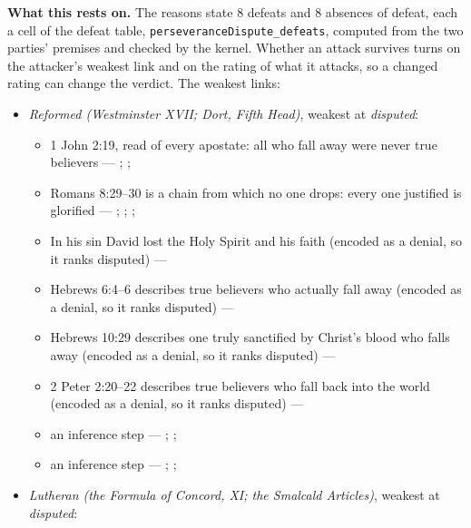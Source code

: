 \documentclass[11pt]{article}
\begin{document}
\par\noindent\textbf{What this rests on.} The reasons state 8 defeats and 8 absences of defeat, each a cell of the defeat table, \texttt{perseverance\allowbreak{}Dispute\_\allowbreak{}defeats}, computed from the two parties' premises and checked by the kernel. Whether an attack survives turns on the attacker's weakest link and on the rating of what it attacks, so a changed rating can change the verdict. The weakest links:
\begin{itemize}
\item \emph{Reformed (Westminster XVII; Dort, Fifth Head)}, weakest at \emph{disputed}:
\begin{itemize}
\item 1 John 2:19, read of every apostate: all who fall away were never true believers --- \cite[594--595]{owen-works-11-perseverance}; \cite[191--192]{calvin-commentaries-catholic-epistles}; \cite[479--480]{npnf1-05-1887}
\item Romans 8:29–30 is a chain from which no one drops: every one justified is glorified --- \cite[582--583]{schaff-creeds-christendom-3-1977}; \cite[557]{schaff-creeds-christendom-3-1977}; \cite[384]{wesley-explanatory-notes-nt}; \cite[413]{wesley-works-9-1827}
\item In his sin David lost the Holy Spirit and his faith (encoded as a denial, so it ranks disputed) --- \cite[299--300]{calvin-psalms-2-1846}
\item Hebrews 6:4–6 describes true believers who actually fall away (encoded as a denial, so it ranks disputed) --- \cite[137--138]{calvin-hebrews-1853}
\item Hebrews 10:29 describes one truly sanctified by Christ’s blood who falls away (encoded as a denial, so it ranks disputed) --- \cite[545--546]{owen-works-23-1855}
\item 2 Peter 2:20–22 describes true believers who fall back into the world (encoded as a denial, so it ranks disputed) --- \cite[410--412]{calvin-commentaries-catholic-epistles}
\item an inference step --- \cite[444--445]{wesley-works-9-1827}; \cite[415--416]{calvin-commentary-john-1847}; \cite[Solid Declaration XI.45]{concordia-triglotta-1921}
\item an inference step --- \cite[Trent, Session VI (1547), ch. 13]{tanner-decrees-1990}; \cite[40]{waterworth-trent-1848}; \cite[Solid Declaration XI.42]{concordia-triglotta-1921}
\end{itemize}
\item \emph{Lutheran (the Formula of Concord, XI; the Smalcald Articles)}, weakest at \emph{disputed}:

\end{itemize}
\end{document}

